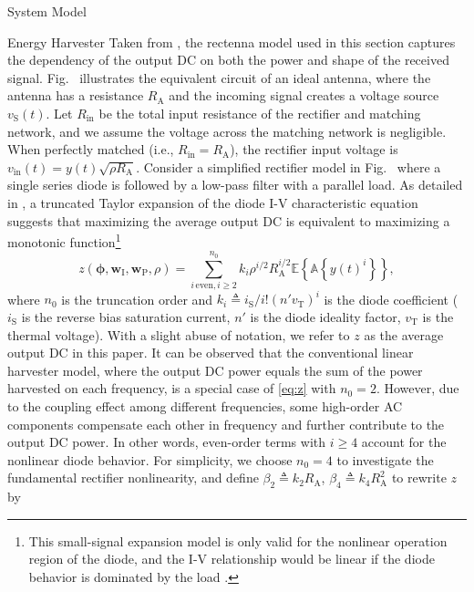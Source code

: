 \documentclass[journal,12pt,onecolumn,draftclsnofoot]{IEEEtran}
\begin{document}
\begin{section}{System Model}
\begin{subsection}{Energy Harvester}
			Taken from \cite{Clerckx2016a}, the rectenna model used in this section captures the dependency of the output DC on both the power and shape of the received signal. Fig.~ illustrates the equivalent circuit of an ideal antenna, where the antenna has a resistance $R_{\mathrm{A}}$ and the incoming signal creates a voltage source $v_{\mathrm{S}}(t)$. Let $R_{\mathrm{in}}$ be the total input resistance of the rectifier and matching network, and we assume the voltage across the matching network is negligible. When perfectly matched (i.e., $R_{\mathrm{in}}=R_{\mathrm{A}}$), the rectifier input voltage is $v_{\mathrm{in}}(t)=y(t)\sqrt{\rho R_{\mathrm{A}}}$. Consider a simplified rectifier model in Fig.~ where a single series diode is followed by a low-pass filter with a parallel load. As detailed in \cite{Clerckx2018b}, a truncated Taylor expansion of the diode I-V characteristic equation suggests that maximizing the average output DC is equivalent to maximizing a monotonic function\footnote{This small-signal expansion model is only valid for the nonlinear operation region of the diode, and the I-V relationship would be linear if the diode behavior is dominated by the load \cite{Clerckx2016a}.}
			\begin{equation}\label{eq:z}
				z(\boldsymbol{\phi},\boldsymbol{w}_{\mathrm{I}},\boldsymbol{w}_{\mathrm{P}},\rho)=\sum_{i\,\mathrm{even},i\ge2}^{n_0}{k_i}{\rho^{i/2}}{R_{\mathrm{A}}^{i/2}}{\mathbb{E}\left\{\mathbb{A}\left\{y(t)^i\right\}\right\}},
			\end{equation}
			where $n_0$ is the truncation order and $k_i \triangleq i_{\mathrm{S}}/i!(n'v_{\mathrm{T}})^i$ is the diode coefficient ($i_{\mathrm{S}}$ is the reverse bias saturation current, $n'$ is the diode ideality factor, $v_{\mathrm{T}}$ is the thermal voltage). With a slight abuse of notation, we refer to $z$ as the average output DC in this paper. It can be observed that the conventional linear harvester model, where the output DC power equals the sum of the power harvested on each frequency, is a special case of \eqref{eq:z} with $n_0=2$. However, due to the coupling effect among different frequencies, some high-order AC components compensate each other in frequency and further contribute to the output DC power. In other words, even-order terms with $i \ge 4$ account for the nonlinear diode behavior. For simplicity, we choose $n_0=4$ to investigate the fundamental rectifier nonlinearity, and define $\beta_2 \triangleq {k_2}{R_{\mathrm{A}}}$, $\beta_4 \triangleq {k_4}{R_{\mathrm{A}}^2}$ to rewrite $z$ by

\end{subsection}
\end{section}
\end{document}
